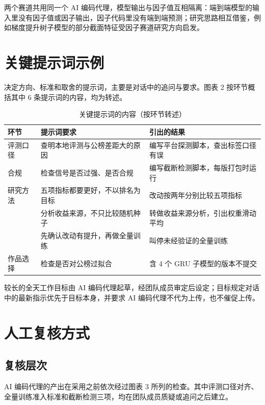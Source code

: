 \documentclass[UTF8,a4paper,zihao=-4,fontset=none]{ctexart}
\newcommand{\tabsetup}{\small\linespread{1.15}\selectfont\renewcommand{\arraystretch}{1.15}}
\begin{document}
两个赛道共用同一个 AI 编码代理，模型输出与因子值互相隔离：端到端模型的输入里没有因子值或因子输出，因子代码里没有端到端预测；研究思路相互借鉴，例如梯度提升树子模型的部分截面特征受因子赛道研究方向启发。

\section{关键提示词示例}

决定方向、标准和取舍的提示词，主要是对话中的追问与要求。图表 2 按环节概括其中 6 条提示词的内容，均为转述。

\begin{table}[!htbp]
\caption{关键提示词的内容（按环节转述）}
\centering\tabsetup
\begin{tabularx}{\textwidth}{@{}p{4em}>{\raggedright\arraybackslash}X>{\raggedright\arraybackslash}X@{}}
\toprule
环节 & 提示词要求 & 引出的结果\\
\midrule
评测口径 & 查明本地评测与公榜差距大的原因 & 编写平台探测脚本，查出标签口径有误\\
\midrule
合规 & 检查信号是否过强、是否合规 & 编写截断检测脚本，每版打包时运行\\
\midrule
研究方法 & 五项指标都要更好，不以排名为目标 & 改动按两年分别比较五项指标\\
 & 分析收益来源，不只比较随机种子 & 转做收益来源分析，引出权重滑动平均\\
 & 先确认改动有提升，再做全量训练 & 叫停未经验证的全量训练\\
\midrule
作品选择 & 检查是否对公榜过拟合 & 含 4 个 GRU 子模型的版本不提交\\
\bottomrule
\end{tabularx}
\end{table}

较长的全天工作目标由 AI 编码代理起草，经团队成员审定后设定；目标规定对话中的最新指示优先于目标本身，并要求 AI 编码代理不代为上传，也不催促上传。

\section{人工复核方式}

\subsection{复核层次}

AI 编码代理的产出在采用之前依次经过图表 3 所列的检查。其中评测口径对齐、全量训练准入标准和截断检测三项，均在团队成员质疑或追问之后建立。
\end{document}
